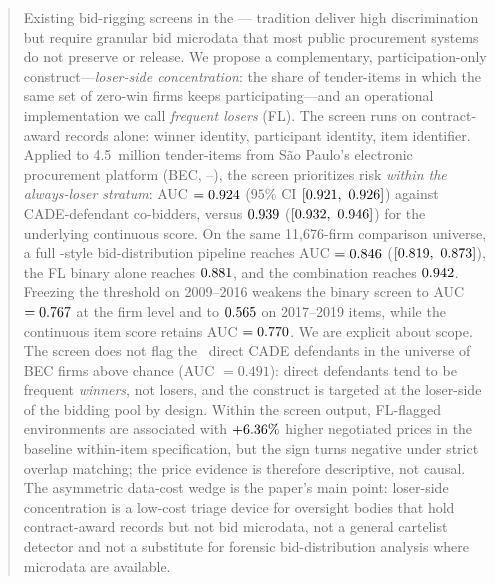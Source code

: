\begin{frontmatter}
\begin{abstract}
Existing bid-rigging screens in the
\citet{porter1993detection}--\citet{bajari2003deciding}--\citet{imhof2019detecting}
tradition deliver high discrimination but require granular
bid microdata that most public procurement systems do not
preserve or release. We propose a complementary,
participation-only construct---\emph{loser-side concentration}:
the share of tender-items in which the same set of
zero-win firms keeps participating---and an operational
implementation we call \emph{frequent losers} (FL). The screen
runs on contract-award records alone: winner identity,
participant identity, item identifier. Applied to 4.5~million
tender-items from São Paulo's electronic procurement
platform (BEC, \valYearStart--\valYearEnd), the screen
prioritizes risk \emph{within the always-loser stratum}: AUC
$=\valAUCFLfirm$ ($95\%$ CI $\valAUCFLfirmCI$) against
\valCobidders CADE-defendant co-bidders, versus
$\valAUClogtc$ ($\valAUClogtcCI$) for the underlying continuous
score. On the same 11{,}676-firm comparison universe, a full
\citeauthor{imhof2019detecting}-style bid-distribution pipeline
reaches AUC $=\valAUCImhofFull$ ($\valAUCImhofFullCI$), the FL
binary alone reaches $\valAUCFLalone$, and the combination
reaches $\valAUCImhofPlusFL$. Freezing the threshold on
2009--2016 weakens the binary screen to AUC
$=\valAUCStrictFirmFL$ at the firm level and to
$\valAUCStrictItemFL$ on 2017--2019 items, while the continuous
item score retains AUC $=\valAUCStrictItemTC$. We are explicit
about scope. The screen does not flag the
\valDirectCADE\ direct CADE defendants in the universe of BEC firms above
chance (AUC $= 0.491$): direct defendants tend to be frequent
\emph{winners}, not losers, and the construct is targeted at
the loser-side of the bidding pool by design. Within the screen
output, FL-flagged environments are associated with
$\valMatchBaselineCoef$ higher negotiated prices in the baseline
within-item specification, but the sign turns negative under
strict overlap matching; the price evidence is therefore
descriptive, not causal. The asymmetric data-cost wedge is the
paper's main point: loser-side concentration is a low-cost
triage device for oversight bodies that hold contract-award
records but not bid microdata, not a general cartelist
detector and not a substitute for forensic bid-distribution
analysis where microdata are available.
\end{abstract}

\end{frontmatter}

